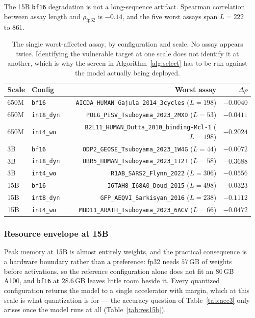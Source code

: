 \documentclass[11pt]{article}
\newcommand{\cfg}[1]{\texttt{#1}}
\begin{document}
The 15B \cfg{bf16} degradation is not a long-sequence artifact. Spearman
correlation between assay length and $\rho_{\text{fp32}}$ is $-0.14$, and the
five worst assays span $L = 222$ to $861$.

\begin{table}[htb]
\centering
\caption{The single worst-affected assay, by configuration and scale. No assay
appears twice. Identifying the vulnerable target at one scale does not identify
it at another, which is why the screen in Algorithm~\ref{alg:select} has to be
run against the model actually being deployed.}
\label{tab:worst3}
\small
\begin{tabular}{llrr}
\toprule
Scale & Config & Worst assay & $\Delta\rho$ \\
\midrule
650M & \cfg{bf16}      & \texttt{AICDA\_HUMAN\_Gajula\_2014\_3cycles} ($L{=}198$) & $-0.0040$ \\
650M & \cfg{int8\_dyn} & \texttt{POLG\_PESV\_Tsuboyama\_2023\_2MXD} ($L{=}53$)    & $-0.0411$ \\
650M & \cfg{int4\_wo}  & \texttt{B2L11\_HUMAN\_Dutta\_2010\_binding-Mcl-1} ($L{=}198$) & $-0.2024$ \\
\addlinespace
3B   & \cfg{bf16}      & \texttt{ODP2\_GEOSE\_Tsuboyama\_2023\_1W4G} ($L{=}44$)   & $-0.0072$ \\
3B   & \cfg{int8\_dyn} & \texttt{UBR5\_HUMAN\_Tsuboyama\_2023\_1I2T} ($L{=}58$)   & $-0.3688$ \\
3B   & \cfg{int4\_wo}  & \texttt{R1AB\_SARS2\_Flynn\_2022} ($L{=}306$)            & $-0.0556$ \\
\addlinespace
15B  & \cfg{bf16}      & \texttt{I6TAH8\_I68A0\_Doud\_2015} ($L{=}498$)           & $-0.0323$ \\
15B  & \cfg{int8\_dyn} & \texttt{GFP\_AEQVI\_Sarkisyan\_2016} ($L{=}238$)         & $-0.1112$ \\
15B  & \cfg{int4\_wo}  & \texttt{MBD11\_ARATH\_Tsuboyama\_2023\_6ACV} ($L{=}66$)  & $-0.0472$ \\
\bottomrule
\end{tabular}
\end{table}

\subsubsection{Resource envelope at 15B}

Peak memory at 15B is almost entirely weights, and the practical consequence is
a hardware boundary rather than a preference: fp32 needs $57$\,GB of weights
before activations, so the reference configuration alone does not fit an
80\,GB A100, and \cfg{bf16} at $28.6$\,GB leaves little room beside it. Every
quantized configuration returns the model to a single accelerator with margin,
which at this scale is what quantization is for --- the accuracy question of
Table~\ref{tab:acc3} only arises once the model runs at all
(Table~\ref{tab:res15b}).
\end{document}
